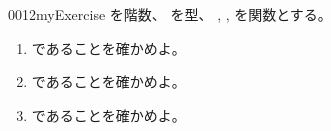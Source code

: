 \documentclass[index]{subfiles}
\begin{document}
\begin{myBlock}{0012}{myExercise}
  を階数、
  を型、
  ,
  ,
  を関数とする。
  \begin{enumerate}
  \item {}
    であることを確かめよ。
  \item {}
    であることを確かめよ。
  \item {}
    であることを確かめよ。
  \end{enumerate}
\end{myBlock}
\end{document}
